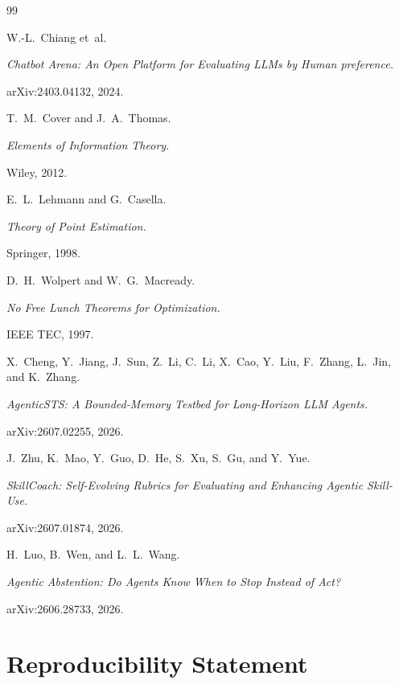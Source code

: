 \documentclass[11pt]{article}
\begin{document}

\begin{thebibliography}{99}

 W.-L.~Chiang et~al.

\newblock \textit{Chatbot Arena: An Open Platform for Evaluating LLMs by Human preference.}

\newblock arXiv:2403.04132, 2024.

 T.~M.~Cover and J.~A.~Thomas.

\newblock \textit{Elements of Information Theory.}

\newblock Wiley, 2012.

 E.~L.~Lehmann and G.~Casella.

\newblock \textit{Theory of Point Estimation.}

\newblock Springer, 1998.

 D.~H.~Wolpert and W.~G.~Macready.

\newblock \textit{No Free Lunch Theorems for Optimization.}

\newblock IEEE TEC, 1997.

 X.~Cheng, Y.~Jiang, J.~Sun, Z.~Li, C.~Li, X.~Cao, Y.~Liu, F.~Zhang, L.~Jin, and K.~Zhang.

\newblock \textit{AgenticSTS: A Bounded-Memory Testbed for Long-Horizon LLM Agents.}

\newblock arXiv:2607.02255, 2026.

 J.~Zhu, K.~Mao, Y.~Guo, D.~He, S.~Xu, S.~Gu, and Y.~Yue.

\newblock \textit{SkillCoach: Self-Evolving Rubrics for Evaluating and Enhancing Agentic Skill-Use.}

\newblock arXiv:2607.01874, 2026.

 H.~Luo, B.~Wen, and L.~L.~Wang.

\newblock \textit{Agentic Abstention: Do Agents Know When to Stop Instead of Act?}

\newblock arXiv:2606.28733, 2026.

\end{thebibliography}


\section*{Reproducibility Statement}
\end{document}
